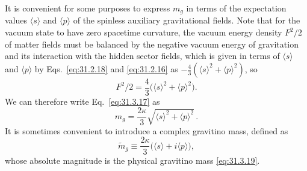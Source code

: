 It is convenient for some purposes to express \(m_g\) in terms of the
expectation values \(\langle s\rangle\) and \(\langle p\rangle\) of the
spinless auxiliary gravitational fields. Note that for the vacuum state
to have zero spacetime curvature, the vacuum energy density \(F^2/2\) of
matter fields must be balanced by the negative vacuum energy of
gravitation and its interaction with the hidden sector fields, which is
given in terms of \(\langle s\rangle\) and \(\langle p\rangle\) by
Eqs.~\eqref{eq:31.2.18} and \eqref{eq:31.2.16} as
\(-\frac43(\langle s\rangle^2+\langle p\rangle^2)\), so
\begin{equation}
  F^2/2=\frac43\bigl(\langle s\rangle^2+\langle p\rangle^2\bigr).
  \tag{31.3.18}\label{eq:31.3.18}
\end{equation}
We can therefore write Eq.~\eqref{eq:31.3.17} as
\begin{equation}
  m_g=\frac{2\kappa}{3}
  \sqrt{\langle s\rangle^2+\langle p\rangle^2}\,.
  \tag{31.3.19}\label{eq:31.3.19}
\end{equation}
It is sometimes convenient to introduce a complex gravitino mass, defined
as
\begin{equation}
  \widetilde m_g\equiv
  \frac{2\kappa}{3}\bigl(\langle s\rangle+i\langle p\rangle\bigr),
  \tag{31.3.20}\label{eq:31.3.20}
\end{equation}
whose absolute magnitude is the physical gravitino mass
\eqref{eq:31.3.19}.
